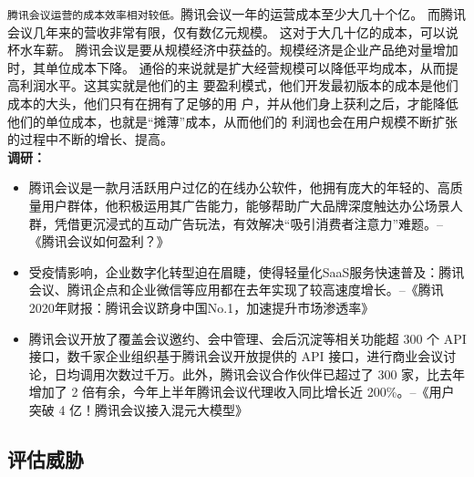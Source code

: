 \documentclass[a4paper,12pt]{article}
\begin{document}
\texttt{腾讯会议运营的成本效率相对较低。}腾讯会议一年的运营成本至少大几十个亿。 而腾讯会议几年来的营收非常有限，仅有数亿元规模。 这对于大几十亿的成本，可以说杯水车薪。
腾讯会议是要从规模经济中获益的。规模经济是企业产品绝对量增加时，其单位成本下降。
通俗的来说就是扩大经营规模可以降低平均成本，从而提高利润水平。这其实就是他们的主
要盈利模式，他们开发最初版本的成本是他们成本的大头，他们只有在拥有了足够的用
户，并从他们身上获利之后，才能降低他们的单位成本，也就是“摊薄”成本，从而他们的
利润也会在用户规模不断扩张的过程中不断的增长、提高。\\
\textbf{调研：}
\begin{itemize}
    \item 腾讯会议是一款月活跃用户过亿的在线办公软件，他拥有庞大的年轻的、高质量用户群体，他积极运用其广告能力，能够帮助广大品牌深度触达办公场景人群，凭借更沉浸式的互动广告玩法，有效解决“吸引消费者注意力”难题。--《腾讯会议如何盈利？》
    \item 受疫情影响，企业数字化转型迫在眉睫，使得轻量化SaaS服务快速普及：腾讯会议、腾讯企点和企业微信等应用都在去年实现了较高速度增长。--《腾讯2020年财报：腾讯会议跻身中国No.1，加速提升市场渗透率》
    \item 腾讯会议开放了覆盖会议邀约、会中管理、会后沉淀等相关功能超 300 个 API 接口，数千家企业组织基于腾讯会议开放提供的 API 接口，进行商业会议讨论，日均调用次数过千万。此外，腾讯会议合作伙伴已超过了 300 家，比去年增加了 2 倍有余，今年上半年腾讯会议代理收入同比增长近 200\%。--《用户突破 4 亿！腾讯会议接入混元大模型》
\end{itemize}

    \subsection{评估威胁}\label{subsec:threat}
\end{document}
